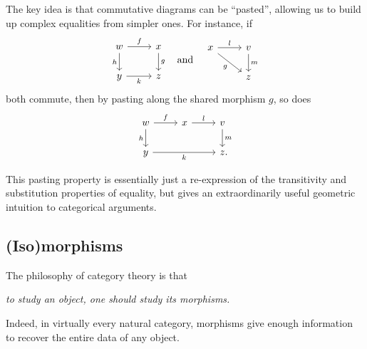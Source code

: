The key idea is that commutative diagrams
can be ``pasted'', allowing us to build up complex equalities from simpler ones.
For instance, if
\[
  \begin{tikzcd}
    w\ar[r, "f"]\ar[d, "h"'] & x\ar[d, "g"] \\
    y\ar[r, "k"'] & z
  \end{tikzcd}\quad
  \text{and}\quad
  \begin{tikzcd}
    x\ar[r, "l"]\ar[rd, "g"'] & v\ar[d, "m"] \\
    & z
  \end{tikzcd}
\] both commute, then by pasting along the shared morphism $g$, so does
\[
  \begin{tikzcd}
    w\ar[r, "f"]\ar[d, "h"'] & x\ar[r, "l"] & v\ar[d, "m"] \\
    y\ar[rr, "k"'] && z\punctuation{.}
  \end{tikzcd}
\]

This pasting property is essentially just a re-expression of the transitivity
and substitution properties of equality, but gives an extraordinarily useful
geometric intuition to categorical arguments.

\subsection{(Iso)morphisms}

The philosophy of category theory is that \begin{center}
  \emph{to study an object, one should study its morphisms.}
\end{center}
Indeed, in virtually every natural category, morphisms give enough information
to recover the entire data of any object.

